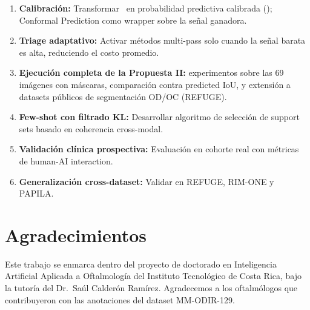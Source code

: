 \documentclass[12pt,a4paper]{article}
\newcommand{\KL}{\mathrm{KL}}
\newcommand{\ECE}{\mathrm{ECE}}
\begin{document}
\begin{enumerate}
    \item \textbf{Calibración:} Transformar \KL\ en probabilidad predictiva calibrada (\ECE); Conformal Prediction como wrapper sobre la señal ganadora.

    \item \textbf{Triage adaptativo:} Activar métodos multi-pass solo cuando la señal barata es alta, reduciendo el costo promedio.

    \item \textbf{Ejecución completa de la Propuesta II:} experimentos sobre las 69 imágenes con máscaras, comparación contra predicted IoU, y extensión a datasets públicos de segmentación OD/OC (REFUGE).

    \item \textbf{Few-shot con filtrado KL:} Desarrollar algoritmo de selección de support sets basado en coherencia cross-modal.

    \item \textbf{Validación clínica prospectiva:} Evaluación en cohorte real con métricas de human-AI interaction.

    \item \textbf{Generalización cross-dataset:} Validar en REFUGE, RIM-ONE y PAPILA.
\end{enumerate}

\section*{Agradecimientos}

Este trabajo se enmarca dentro del proyecto de doctorado en Inteligencia Artificial Aplicada a Oftalmología del Instituto Tecnológico de Costa Rica, bajo la tutoría del Dr.~Saúl Calderón Ramírez.
Agradecemos a los oftalmólogos que contribuyeron con las anotaciones del dataset MM-ODIR-129.
\end{document}
